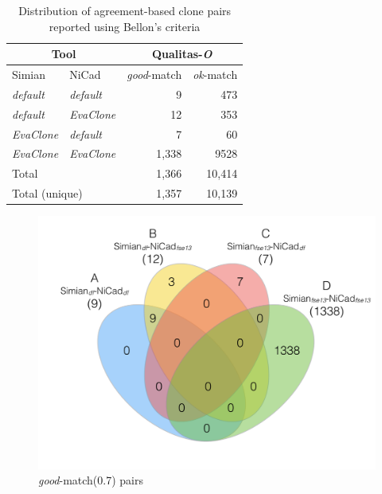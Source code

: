 \documentclass{sig-alternate-05-2015}
\begin{document}
\begin{table}[H]
	\centering
	\caption{Distribution of agreement-based clone pairs reported using Bellon's criteria}
	\label{t_agreed_good_clone_pairs}
	\small
	\begin{tabular}{l|l|r|r}
		\hline
		\multicolumn{2}{c|}{Tool} & \multicolumn{2}{c}{Qualitas-\textit{O}} \\
		\hline
		Simian & NiCad & \textit{good}-match & \textit{ok}-match \\
		\hline
		\textit{default} & \textit{default} & 9 	& 473 \\ 
		\textit{default} & \textit{EvaClone} 	& 12 	& 353 \\ 
		\textit{EvaClone} 	& \textit{default} 	& 7 	& 60 \\
		\textit{EvaClone} 	& \textit{EvaClone} 	& 1,338 & 9528 \\ 
		\hline
		\multicolumn{2}{l|}{Total} & 1,366 & 10,414 \\
		\hline
		\multicolumn{2}{l|}{Total (unique)} & 1,357 & 10,139 \\
		\hline
	\end{tabular}
\end{table}

\begin{figure}
		\centering
		\includegraphics[width=0.9\linewidth]{venn4_pairs_good}
		\caption{\textit{good}-match(0.7) pairs}
		\label{fig:venn4_orig_good}
\end{figure}
\end{document}
